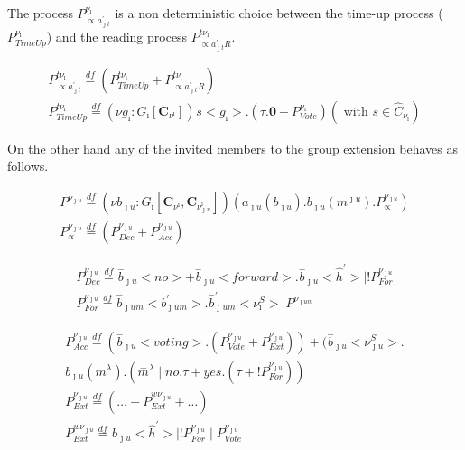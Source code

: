 The process $P^{\nu_\imath}_{\propto a^\prime_{\jmath t}}$ is a non deterministic choice between the time-up process ($P^{\nu_\imath}_{TimeUp}$) and the reading process $P^{t\nu_\imath}_{\propto a^\prime_{\jmath t}R}$.

\begin{equation} 
	\label{eq:pviexpr12}
	\begin{gathered} 
		P^{t\nu_\imath}_{\propto a^\prime_{\jmath t}}\overset{df}{=}(P^{t\nu_\imath}_{TimeUp} + P^{t\nu_\imath}_{\propto a^\prime_{\jmath t}R})\\
		P^{t\nu_\imath}_{TimeUp}\overset{df}{=}(\nu g_\imath:G_\imath[\mathbf{C}_{\nu^\imath}])\overset{-}{s}<g_\imath>.(\tau.\mathbf{0} + P^{\nu_\imath}_{Vote}) (\mbox{ with } s\in \hat{C}_{\nu_\imath})	
	\end{gathered}
\end{equation}

On the other hand any of the invited members to the group extension behaves as follows.

\begin{equation} 
	\label{eq:pvjexpr11}
	\begin{gathered}
		P^{\nu_{\jmath u}}\overset{df}{=} (\nu b_{\jmath u}:G_\imath[\mathbf{C}_{\nu^\imath}, \mathbf{C}_{\nu_{\jmath u}^\imath}]) (a_{\jmath u}(b_{\jmath u}).b_{\jmath u}(m^{\jmath u}).P^{\nu_{\jmath u}}_\propto)\\
		P^{\nu_{\jmath u}}_\propto \overset{df}{=} (P^{\nu_{\jmath u}}_{Dec} + P^{\nu_{\jmath u}}_{Acc})		
	\end{gathered}
\end{equation}

\begin{equation} 
	\label{eq:pvjexpr12}
	\begin{gathered}
		P^{\nu_{\jmath u}}_{Dec}\overset{df}{=}\overset{-}{b}_{\jmath u}<no> + \overset{-}{b}_{\jmath u}<forward>.\overset{-}{b}_{\jmath u}<\hat{h}^\prime>\mid !P^{\nu_{\jmath u}}_{For}\\
		P^{\nu_{\jmath u}}_{For}\overset{df}{=}\overset{-}{b}_{\jmath um}<b^\prime_{\jmath um}>.\overset{-}{b}^\prime_{\jmath um}<\nu^S_\imath>\mid P^{\nu_{\jmath um}}
	\end{gathered}
\end{equation}

\begin{equation} 
	\label{eq:pvjexpr13}
	\begin{gathered}
		P^{\nu_{\jmath u}}_{Acc}\overset{df}{=}(\overset{-}{b}_{\jmath u}<voting>.(P^{\nu_{\jmath u}}_{Vote} + P^{\nu_{\jmath u}}_{Ext})) + (\overset{-}{b}_{\jmath u}<\nu_{\jmath u}^S>.\\{b}_{\jmath u}(m^\lambda).(\overset{-}{m}^\lambda\mid no.\tau + yes.(\tau + !P^{\nu_{\jmath u}}_{For}))\\
		P^{\nu_{\jmath u}}_{Ext} \overset{df}{=}(\ldots +  P^{w\nu_{\jmath u}}_{Ext} + \ldots)\\
		P^{w\nu_{\jmath u}}_{Ext}\overset{df}{=}\overset{-}{b}_{\jmath u}<\hat{h}^\prime>\mid !P^{\nu_{\jmath u}}_{For}\mid P^{\nu_{\jmath u}}_{Vote}\\
	\end{gathered}
\end{equation}


